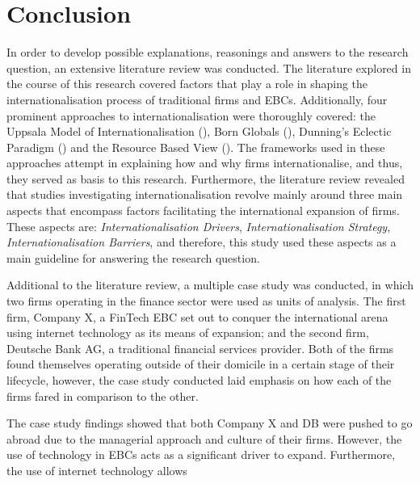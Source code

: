\documentclass[11pt,a4paper]{article}
\begin{document}
{{{\section{Conclusion}
\label{conclusion}
\vspace{-1mm}
  \par
In order to develop possible explanations, reasonings and answers to the research question, an extensive literature review was conducted. The literature explored in the course of this research covered factors that play a role in shaping the internationalisation process of traditional firms and EBCs. Additionally, four prominent approaches to internationalisation were thoroughly covered: the Uppsala Model of Internationalisation (\cite{johansonInternationalizationProcessFirm1977}), Born Globals (\cite{rennieGlobalCompetitivenessBorn1993}), Dunning's Eclectic Paradigm (\cite{dunningEclecticTheoryInternational1980}) and the Resource Based View (\cite{barneyFirmResourcesSustained1991}). The frameworks used in these approaches attempt in explaining how and why firms internationalise, and thus, they served as basis to this research. Furthermore, the literature review revealed that studies investigating internationalisation revolve mainly around three main aspects that encompass factors facilitating the international expansion of firms. These aspects are: \textit{Internationalisation Drivers}, \textit{Internationalisation Strategy}, \textit{Internationalisation Barriers}, and therefore, this study used these aspects as a main guideline for answering the research question.  \par
Additional to the literature review, a multiple case study was conducted, in which two firms operating in the finance sector were used as units of analysis. The first firm, Company X, a FinTech EBC set out to conquer the international arena using internet technology as its means of expansion; and the second firm, Deutsche Bank AG, a traditional financial services provider. Both of the firms found themselves operating outside of their domicile in a certain stage of their lifecycle, however, the case study conducted laid emphasis on how each of the firms fared in comparison to the other. \par
The case study findings showed that both Company X and DB were pushed to go abroad due to the managerial approach and culture of their firms. However, the use of technology in EBCs acts as a significant driver to expand. Furthermore, the use of internet technology allows \newpage

}}}
\end{document}
